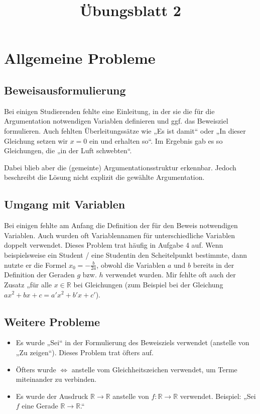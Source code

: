 \documentclass[a4paper]{article}
\title{Übungsblatt 2}
\date{}
\newcommand*{\R}{\mathbb R}
\begin{document}
\maketitle

\section{Allgemeine Probleme}

\subsection{Beweisausformulierung}

Bei einigen Studierenden fehlte eine Einleitung, in der sie die für die Argumentation notwendigen Variablen definieren und ggf. das Beweisziel formulieren. Auch fehlten Überleitungssätze wie „Es ist damit\textellipsis“ oder „In dieser Gleichung setzen wir $x=0$ ein und erhalten so\textellipsis“. Im Ergebnis gab es so Gleichungen, die „in der Luft schwebten“.

Dabei blieb aber die (gemeinte) Argumentationsstruktur erkennbar. Jedoch beschreibt die Lösung nicht explizit die gewählte Argumentation.

\subsection{Umgang mit Variablen}

Bei einigen fehlte am Anfang die Definition der für den Beweis notwendigen Variablen. Auch wurden oft Variablennamen für unterschiedliche Variablen doppelt verwendet. Dieses Problem trat häufig in Aufgabe 4 auf. Wenn beispielsweise ein Student / eine Studentin den Scheitelpunkt bestimmte, dann nutzte er die Formel $x_0=-\frac{b}{2a}$, obwohl die Variablen $a$ und $b$ bereits in der Definition der Geraden $g$ bzw. $h$ verwendet wurden. Mir fehlte oft auch der Zusatz „für alle $x\in\R$ bei Gleichungen (zum Beispiel bei der Gleichung $ax^2+bx+c=a'x^2+b'x+c'$).

\subsection{Weitere Probleme}

\begin{itemize}
  \item Es wurde „Sei“ in der Formulierung des Beweisziels verwendet (anstelle von „Zu zeigen“). Dieses Problem trat öfters auf.
  \item Öfters wurde $\iff$ anstelle vom Gleichheitszeichen verwendet, um Terme miteinander zu verbinden.
  \item Es wurde der Ausdruck $\R\to\R$ anstelle von $f:\R\to\R$ verwendet. Beispiel: „Sei $f$ eine Gerade $\R\to\R$.“
\end{itemize}
\end{document}
